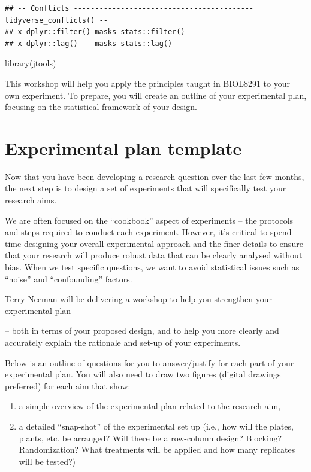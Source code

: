 \documentclass[
]{book}
\newenvironment{Shaded}{\begin{snugshade}}{\end{snugshade}}
\newcommand{\FunctionTok}[1]{\textcolor[rgb]{0.00,0.00,0.00}{#1}}
\newcommand{\NormalTok}[1]{#1}
\begin{document}
\begin{verbatim}
## -- Conflicts ------------------------------------------ tidyverse_conflicts() --
## x dplyr::filter() masks stats::filter()
## x dplyr::lag()    masks stats::lag()
\end{verbatim}

\begin{Shaded}
\begin{Highlighting}[]
\FunctionTok{library}\NormalTok{(jtools)}
\end{Highlighting}
\end{Shaded}

This workshop will help you apply the principles taught in BIOL8291 to your own experiment. To prepare, you will create an outline of your experimental plan, focusing on the statistical framework of your design.

\hypertarget{experimental-plan-template}{%
\chapter{Experimental plan template}\label{experimental-plan-template}}

Now that you have been developing a research question over the last few months, the next step is to design a set of experiments that will specifically test your research aims.

We are often focused on the ``cookbook'' aspect of experiments -- the protocols and steps required to conduct each experiment. However, it's critical to spend time designing your overall experimental approach and the finer details to ensure that your research will produce robust data that can be clearly analysed without bias. When we test specific questions, we want to avoid statistical issues such as ``noise'' and ``confounding'' factors.

Terry Neeman will be delivering a workshop to help you strengthen your experimental plan

-- both in terms of your proposed design, and to help you more clearly and accurately explain the rationale and set-up of your experiments.

Below is an outline of questions for you to answer/justify for each part of your experimental plan. You will also need to draw two figures (digital drawings preferred) for each aim that show:

\begin{enumerate}
\def\labelenumi{\arabic{enumi})}
\item
  a simple overview of the experimental plan related to the research aim,
\item
  a detailed ``snap-shot'' of the experimental set up (i.e., how will the plates, plants, etc. be arranged? Will there be a row-column design? Blocking? Randomization? What treatments will be applied and how many replicates will be tested?)
\end{enumerate}
\end{document}
